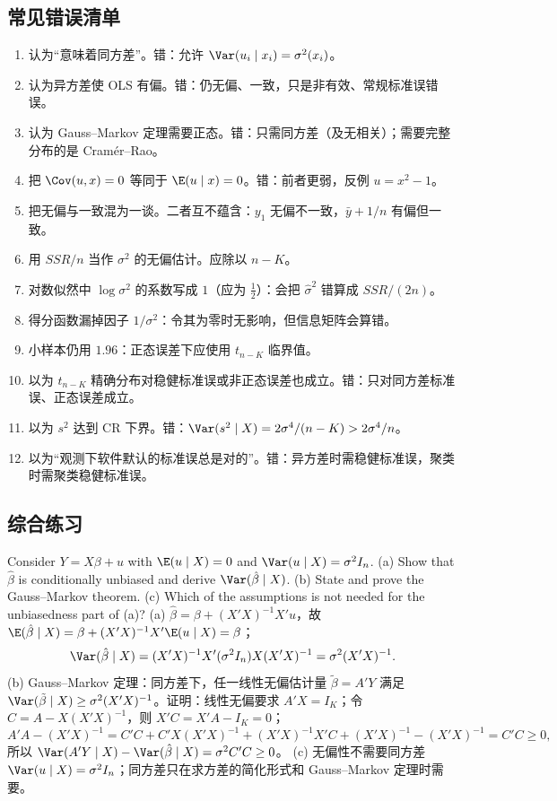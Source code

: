 \subsection{常见错误清单}

\begin{enumerate}[label=(\arabic*)]
  \item 认为“\iid 意味着同方差”。错：\iid 允许 $\Var(u_i\mid x_i)=\sigma^2(x_i)$。
  \item 认为异方差使 OLS 有偏。错：仍无偏、一致，只是非有效、常规标准误错误。
  \item 认为 Gauss--Markov 定理需要正态。错：只需同方差（及无相关）；需要完整分布的是 Cramér--Rao。
  \item 把 $\Cov(u,x)=0$ 等同于 $\E(u\mid x)=0$。错：前者更弱，反例 $u=x^2-1$。
  \item 把无偏与一致混为一谈。二者互不蕴含：$y_1$ 无偏不一致，$\bar y+1/n$ 有偏但一致。
  \item 用 $SSR/n$ 当作 $\sigma^2$ 的无偏估计。应除以 $n-K$。
  \item 对数似然中 $\log\sigma^2$ 的系数写成 $1$（应为 $\frac12$）：会把 $\hat\sigma^2$ 错算成 $SSR/(2n)$。
  \item 得分函数漏掉因子 $1/\sigma^2$：令其为零时无影响，但信息矩阵会算错。
  \item 小样本仍用 $1.96$：正态误差下应使用 $t_{n-K}$ 临界值。
  \item 以为 $t_{n-K}$ 精确分布对稳健标准误或非正态误差也成立。错：只对同方差标准误、正态误差成立。
  \item 以为 $s^2$ 达到 CR 下界。错：$\Var(s^2\mid X)=2\sigma^4/(n-K)>2\sigma^4/n$。
  \item 以为“\iid 观测下软件默认的标准误总是对的”。错：异方差时需稳健标准误，聚类时需聚类稳健标准误。
\end{enumerate}

\subsection{综合练习}

\begin{prac}
Consider $Y=X\beta+u$ with $\E(u\mid X)=0$ and $\Var(u\mid X)=\sigma^2I_n$. (a) Show that $\hat\beta$ is conditionally unbiased and derive $\Var(\hat\beta\mid X)$. (b) State and prove the Gauss--Markov theorem. (c) Which of the assumptions is not needed for the unbiasedness part of (a)?
\answer
(a) $\hat\beta=\beta+(X'X)^{-1}X'u$，故 $\E(\hat\beta\mid X)=\beta+(X'X)^{-1}X'\E(u\mid X)=\beta$；
\[
\Var(\hat\beta\mid X)=(X'X)^{-1}X'(\sigma^2I_n)X(X'X)^{-1}=\sigma^2(X'X)^{-1}.
\]
(b) Gauss--Markov 定理：同方差下，任一线性无偏估计量 $\tilde\beta=A'Y$ 满足 $\Var(\tilde\beta\mid X)\ge\sigma^2(X'X)^{-1}$。证明：线性无偏要求 $A'X=I_K$；令 $C=A-X(X'X)^{-1}$，则 $X'C=X'A-I_K=0$；
\[
A'A-(X'X)^{-1}=C'C+C'X(X'X)^{-1}+(X'X)^{-1}X'C+(X'X)^{-1}-(X'X)^{-1}=C'C\ge0,
\]
所以 $\Var(A'Y\mid X)-\Var(\hat\beta\mid X)=\sigma^2C'C\ge0$。
(c) 无偏性不需要同方差 $\Var(u\mid X)=\sigma^2I_n$；同方差只在求方差的简化形式和 Gauss--Markov 定理时需要。
\end{prac}

